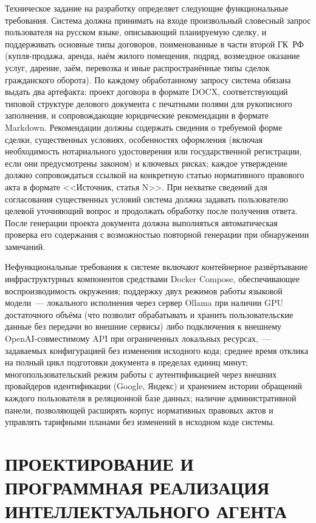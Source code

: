 Техническое задание на разработку определяет следующие функциональные требования. Система должна принимать на входе произвольный словесный запрос пользователя на русском языке, описывающий планируемую сделку, и поддерживать основные типы договоров, поименованные в части второй ГК~РФ (купля-продажа, аренда, наём жилого помещения, подряд, возмездное оказание услуг, дарение, заём, перевозка и иные распространённые типы сделок гражданского оборота). По каждому обработанному запросу система обязана выдать два артефакта: проект договора в формате DOCX, соответствующий типовой структуре делового документа с печатными полями для рукописного заполнения, и сопровождающие юридические рекомендации в формате Markdown. Рекомендации должны содержать сведения о требуемой форме сделки, существенных условиях, особенностях оформления (включая необходимость нотариального удостоверения или государственной регистрации, если они предусмотрены законом) и ключевых рисках; каждое утверждение должно сопровождаться ссылкой на конкретную статью нормативного правового акта в формате <<Источник, статья N>>. При нехватке сведений для согласования существенных условий система должна задавать пользователю целевой уточняющий вопрос и продолжать обработку после получения ответа. После генерации проекта документа должна выполняться автоматическая проверка его содержания с возможностью повторной генерации при обнаружении замечаний.

Нефункциональные требования к системе включают контейнерное развёртывание инфраструктурных компонентов средствами Docker Compose, обеспечивающее воспроизводимость окружения; поддержку двух режимов работы языковой модели~--- локального исполнения через сервер Ollama при наличии GPU достаточного объёма (что позволит обрабатывать и хранить пользовательские данные без передачи во внешние сервисы) либо подключения к внешнему OpenAI-совместимому API при ограниченных локальных ресурсах,~--- задаваемых конфигурацией без изменения исходного кода; среднее время отклика на полный цикл подготовки документа в пределах единиц минут; многопользовательский режим работы с аутентификацией через внешних провайдеров идентификации (Google, Яндекс) и хранением истории обращений каждого пользователя в реляционной базе данных; наличие административной панели, позволяющей расширять корпус нормативных правовых актов и управлять тарифными планами без изменений в исходном коде системы.

\section{ПРОЕКТИРОВАНИЕ И ПРОГРАММНАЯ РЕАЛИЗАЦИЯ ИНТЕЛЛЕКТУАЛЬНОГО АГЕНТА}

